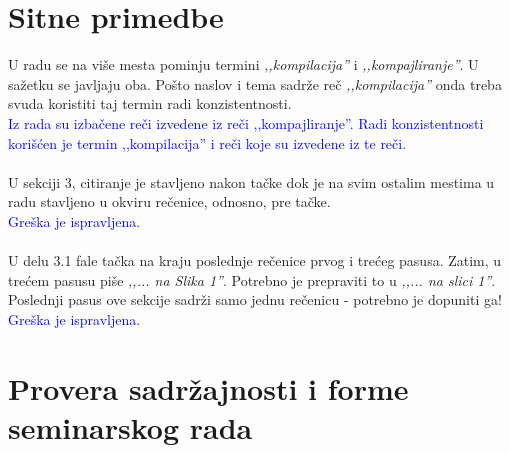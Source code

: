 \documentclass[a4paper]{report}
\newcommand{\odgovor}[1]{\textcolor{blue}{#1}}
\begin{document}
\section{Sitne primedbe}

\noindent U radu se na više mesta pominju termini \textit{‚‚kompilacija''} i \textit{‚‚kompajliranje''}. U sažetku se javljaju oba. Pošto naslov i tema sadrže reč \textit{‚‚kompilacija''} onda treba svuda koristiti taj termin radi konzistentnosti.
\\
\odgovor{ Iz rada su izbačene reči izvedene iz reči ,,kompajliranje''. Radi konzistentnosti korišćen je termin ,,kompilacija'' i reči koje su izvedene iz te reči.}
\\
\\
U sekciji 3, citiranje je stavljeno nakon tačke dok je na svim ostalim mestima u radu stavljeno u okviru rečenice, odnosno, pre tačke.
\\
\odgovor{ Greška je ispravljena. }
\\
\\
U delu 3.1 fale tačka na kraju poslednje rečenice prvog i trećeg pasusa. Zatim, u trećem pasusu piše \textit{‚‚... na Slika 1''}. Potrebno je prepraviti to u \textit{‚‚... na slici 1''}. Poslednji pasus ove sekcije sadrži samo jednu rečenicu - potrebno je dopuniti ga!
\\
\odgovor{ Greška je ispravljena. }


\section{Provera sadržajnosti i forme seminarskog rada}
\end{document}

